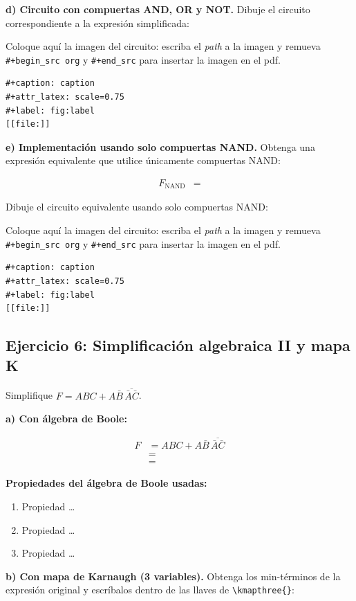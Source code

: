 \documentclass[11pt]{article}
\begin{document}
\textbf{d) Circuito con compuertas AND, OR y NOT.} Dibuje el circuito
correspondiente a la expresión simplificada:

Coloque aquí la imagen del circuito: escriba el  \emph{path} a la imagen y
remueva \texttt{\#+begin\_src org} y \texttt{\#+end\_src} para insertar la imagen en el pdf. 

\begin{verbatim}
#+caption: caption
#+attr_latex: scale=0.75
#+label: fig:label
[[file:]]
\end{verbatim}

\textbf{e) Implementación usando solo compuertas NAND.} Obtenga una expresión
equivalente que utilice únicamente compuertas NAND:

\begin{align*}
  F_{\text{NAND}} &=
\end{align*}

Dibuje el circuito equivalente usando solo compuertas NAND:

Coloque aquí la imagen del circuito: escriba el  \emph{path} a la imagen y
remueva \texttt{\#+begin\_src org} y \texttt{\#+end\_src} para insertar la imagen en el pdf. 

\begin{verbatim}
#+caption: caption
#+attr_latex: scale=0.75
#+label: fig:label
[[file:]]
\end{verbatim}

\subsection{Ejercicio 6: Simplificación algebraica II y mapa K}
\label{sec:org535cbf8}
Simplifique \(F=ABC+A\bar{B}\,\overline{\bar{A}\bar{C}}\).

\textbf{a) Con álgebra de Boole:}

\begin{align*}
  F &= ABC+A\bar{B}\,\overline{\bar{A}\bar{C}} \\
    &= \\
    &=
\end{align*}

\textbf{Propiedades del álgebra de Boole usadas:}
\begin{enumerate}
\item Propiedad \ldots{}
\item Propiedad \ldots{}
\item Propiedad \ldots{}
\end{enumerate}

\textbf{b) Con mapa de Karnaugh (3 variables).} Obtenga los min-términos de
la expresión original y escríbalos dentro de las llaves de \texttt{\textbackslash{}kmapthree\{\}}:
\end{document}
